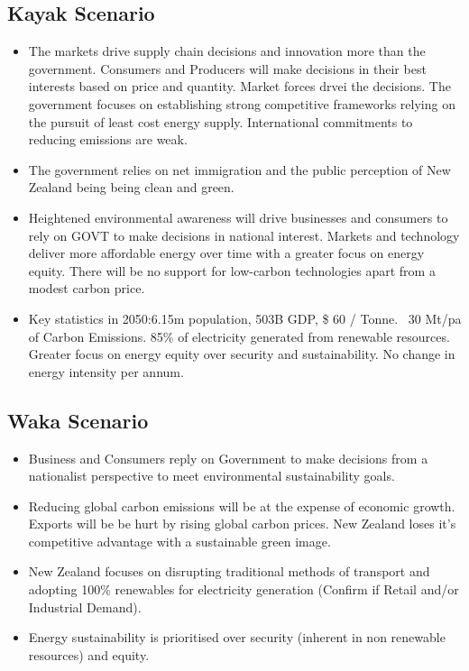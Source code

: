 \documentclass[12pt]{article}
\begin{document}
    \subsection{Kayak Scenario}
    \begin{itemize}
        \item   The markets drive supply chain decisions and innovation more than the government.
                Consumers and Producers will make decisions in their best interests based on price
                and quantity. Market forces drvei the decisions. The government focuses on
                establishing strong competitive frameworks relying on the pursuit of least
                cost energy supply. International commitments to reducing emissions are weak.
        \item   The government relies on net immigration and the public perception of New Zealand being
                being clean and green.
        \item   Heightened environmental awareness will drive businesses and consumers to rely on GOVT to make
                decisions in national interest. Markets and technology deliver more affordable energy over time
                with a greater focus on energy equity. There will be no support for low-carbon technologies
                apart from a modest carbon price. 
        \item   Key statistics in 2050:6.15m population, 503B GDP, \$ 60 / Tonne. ~30 Mt/pa of Carbon Emissions.
                85\% of electricity generated from renewable resources. Greater focus on energy equity over security
                and sustainability. No change in energy intensity per annum.
    
    \end{itemize}
    \subsection{Waka Scenario}
    \begin{itemize}
        \item   Business and Consumers reply on Government to make decisions from a nationalist perspective
                to meet environmental sustainability goals.
        \item   Reducing global carbon emissions will be at the expense of economic growth. Exports will be
                be hurt by rising global carbon prices. New Zealand loses it's competitive advantage with a 
                sustainable green image.
        \item   New Zealand focuses on disrupting traditional methods of transport and adopting 100\% 
                renewables for electricity generation (Confirm if Retail and/or Industrial Demand).
        \item   Energy sustainability is prioritised over security (inherent in non renewable resources)
                and equity.
    \end{itemize}
\end{document}
